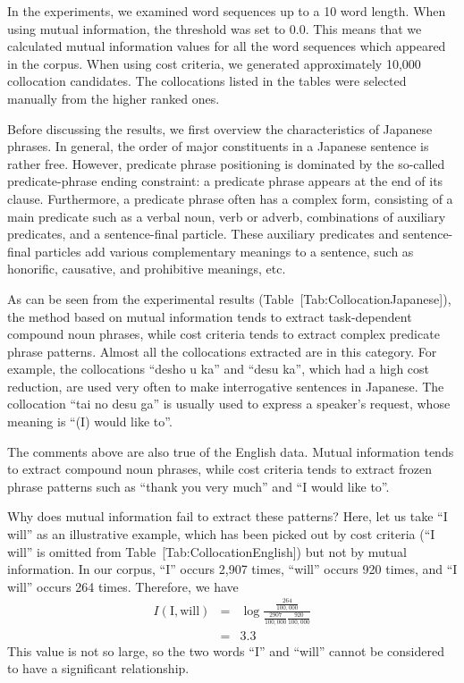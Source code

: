 In the experiments,
we examined word sequences up to a 10 word length.
When using mutual information,
the threshold was set to 0.0.
This means that we calculated mutual information values
for all the word sequences which appeared in the corpus.
When using cost criteria,
we generated approximately 10,000 collocation candidates.
The collocations listed in the tables were selected manually
from the higher ranked ones.

Before discussing the results,
we first overview the characteristics of Japanese phrases.
In general, the order of major constituents in a Japanese sentence is rather free.
However, predicate phrase positioning is dominated by
the so-called predicate-phrase ending constraint:
a predicate phrase appears at the end of its clause.
Furthermore, a predicate phrase often has a complex form,
consisting of a main predicate such as a verbal noun, verb or adverb,
combinations of auxiliary predicates, and a sentence-final particle.
These auxiliary predicates and sentence-final particles
add various complementary meanings to a sentence,
such as honorific, causative,
and prohibitive meanings, etc.

As can be seen from the experimental results
(Table~[Tab:CollocationJapanese]),
the method based on mutual information tends to
extract task-dependent compound noun phrases,
while cost criteria tends to extract complex predicate phrase patterns.
Almost all the collocations extracted are in this category.
For example,
the collocations ``desho u ka'' and ``desu ka'',
which had a high cost reduction,
are used very often to make interrogative sentences in Japanese.
The collocation ``tai no desu ga'' is usually used to
express a speaker's request,
whose meaning is ``(I) would like to''.

The comments above are also true of the English data.
Mutual information tends to extract compound noun phrases,
while cost criteria tends to extract frozen phrase patterns
such as ``thank you very much'' and ``I would like to''.

Why does mutual information fail to extract these patterns?
Here, let us take ``I will'' as an illustrative example,
which has been picked out by cost criteria
(``I will'' is omitted from Table~[Tab:CollocationEnglish])
but not by mutual information.
In our corpus,
``I'' occurs 2,907 times, ``will'' occurs 920 times,
and ``I  will'' occurs 264 times.
Therefore, we have
\begin{eqnarray}
  I(\mbox{I},\mbox{will}) & = & \log \frac{\frac{264}{100,000}}{\frac{2907}{100,000} \frac{920}{100,000}} \nonumber \\
        & = & 3.3
\end{eqnarray}
This value is not so large,
so the two words ``I'' and ``will'' cannot be considered to
have a significant relationship.

